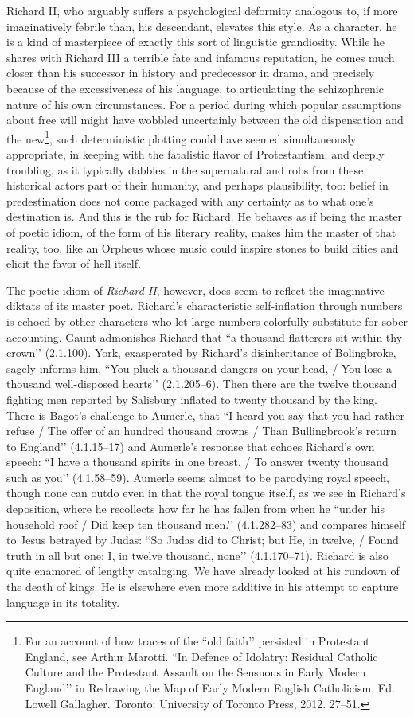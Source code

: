 Richard II, who arguably suffers a psychological deformity analogous to, if more imaginatively febrile than, his descendant, elevates this style.
As a character, he is a kind of masterpiece of exactly this sort of linguistic grandiosity.
While he shares with Richard III a terrible fate and infamous reputation, he comes much closer than his successor in history and predecessor in drama, and precisely because of the excessiveness of his language, to articulating the schizophrenic nature of his own circumstances.
For a period during which popular assumptions about free will might have wobbled uncertainly between the old dispensation and the new\footnote{For an account of how traces of the ``old faith’’ persisted in Protestant England, see Arthur Marotti.
``In Defence of Idolatry: Residual Catholic Culture and the Protestant Assault on the Sensuous in Early Modern England’’ in Redrawing the Map of Early Modern English Catholicism. Ed. Lowell Gallagher. Toronto: University of Toronto Press, 2012. 27--51.}, such deterministic plotting could have seemed simultaneously appropriate, in keeping with the fatalistic flavor of Protestantism, and deeply troubling, as it typically dabbles in the supernatural and robs from these historical actors part of their humanity, and perhaps plausibility, too: belief in predestination does not come packaged with any certainty as to what one’s destination is.
And this is the rub for Richard.
He behaves as if being the master of poetic idiom, of the form of his literary reality, makes him the master of that reality, too, like an Orpheus whose music could inspire stones to build cities and elicit the favor of hell itself.

The poetic idiom of \emph{Richard II}, however, does seem to reflect the imaginative diktats of its master poet.
Richard’s characteristic self-inflation through numbers is echoed by other characters who let large numbers colorfully substitute for sober accounting.
Gaunt admonishes Richard that ``a thousand flatterers sit within thy crown’’ (2.1.100).
York, exasperated by Richard’s disinheritance of Bolingbroke, sagely informs him, ``You pluck a thousand dangers on your head, / You lose a thousand well-disposed hearts’’ (2.1.205--6).
Then there are the twelve thousand fighting men reported by Salisbury inflated to twenty thousand by the king.
There is Bagot’s challenge to Aumerle, that ``I heard you say that you had rather refuse / The offer of an hundred thousand crowns / Than Bullingbrook’s return to England’’ (4.1.15--17) and Aumerle’s response that echoes Richard’s own speech: ``I have a thousand spirits in one breast, / To answer twenty thousand such as you’’ (4.1.58--59).
Aumerle seems almost to be parodying royal speech, though none can outdo even in that the royal tongue itself, as we see in Richard’s deposition, where he recollects how far he has fallen from when he ``under his household roof / Did keep ten thousand men.’’ (4.1.282--83) and compares himself to Jesus betrayed by Judas: ``So Judas did to Christ; but He, in twelve, / Found truth in all but one; I, in twelve thousand, none’’ (4.1.170--71).
Richard is also quite enamored of lengthy cataloging.
We have already looked at his rundown of the death of kings.
He is elsewhere even more additive in his attempt to capture language in its totality.

